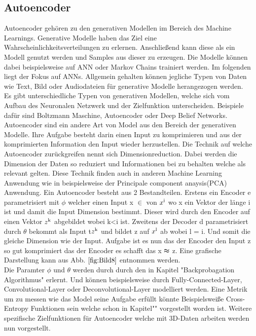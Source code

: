 \documentclass{llncs}
\begin{document}
\subsection{Autoencoder}

Autoencoder gehören zu den generativen Modellen im Bereich des Machine Learnings. Generative Modelle haben das Ziel eine Wahrscheinlichkeitsverteilungen zu erlernen. Anschließend kann diese als ein Modell genutzt werden und Samples aus dieser zu erzeugen. Die Modelle können dabei beispielsweise auf ANN oder Markov Chains trainiert werden\cite{Grundlagen}. Im folgenden liegt der Fokus auf ANNs. Allgemein gehalten können jegliche Typen von Daten wie Text, Bild oder Audiodateien für generative Modelle herangezogen werden. Es gibt unterschiedliche Typen von generativen Modellen, welche sich vom Aufbau des Neuronalen Netzwerk und der Zielfunktion unterscheiden. Beispiele dafür sind Boltzmann Maschine, Autoencoder oder Deep Belief Networks\cite{Grundlagen}.
\\

Autoencoder sind ein andere Art von Model aus den Bereich der generativen Modelle. Ihre Aufgabe besteht darin einen Input zu komprimieren und aus der komprimierten Information den Input wieder herzustellen. Die Technik auf welche Autoencoder zurückgreifen nennt sich Dimensionreduction. Dabei werden die Dimension der Daten so reduziert und Informationen bei zu behalten welche als relevant gelten. Diese Technik finden auch in anderen Machine Learning Anwendung wie in beispielsweise der Principale component anaysis(PCA) Anwendung.  Ein Autoencoder besteht aus 2 Bestandteilen. Erstens ein Encoder e parametrisiert mit $\phi$ welcher einen Input x $\in$ von $x\textsuperscript{i}$ wo x ein Vektor der länge i ist und damit die Input Dimension bestimmt. Dieser wird durch den Encoder auf einen Vektor $z\textsuperscript{k}$ abgebildet wobei k<i ist.  Zweitens der Decoder d parametrisiert durch  $\theta$ bekommt als Input t$z\textsuperscript{k}$ und bildet z auf $x\textsuperscript{l}$ ab wobei l = i. Und somit die gleiche Dimension wie der Input. Aufgabe ist es nun das der Encoder den Input z so gut komprimiert das der  Encoder es schafft das x $\thickapprox$ z. Eine grafische Darstellung kann aus Abb. $\ref{fig:Bild8}$ entnommen werden. 
\\
Die Paramter $\phi$ und $\theta$ werden durch durch den in Kapitel "Backprobagation Algorithmus" erlernt. Und können beispielsweise durch Fully-Connected-Layer, Convolutional-Layer oder Deconvolutional-Layer modelliert werden. Eine Metrik um zu messen wie das Model seine Aufgabe erfüllt könnte Beispielsweiße Cross-Entropy Funktionen sein welche schon in Kapitel"" vorgestellt worden ist. Weitere spezifische Zielfunktionen für Autoencoder welche mit 3D-Daten arbeiten werden nun vorgestellt.
\end{document}
